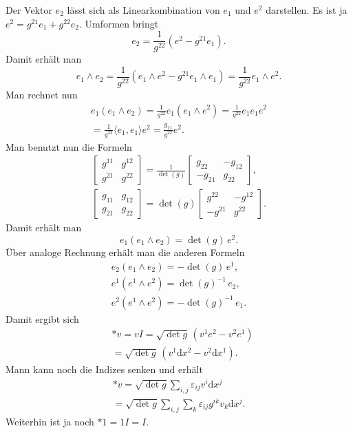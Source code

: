 \documentclass[a4paper,10pt,fleqn,twocolumn,twoside]{article}
\numberwithin{equation}{section}
\begin{document}
Der Vektor $e_2$ lässt sich als Linearkombination von $e_1$
und $e^2$ darstellen. Es ist ja $e^2=g^{21}e_1+g^{22}e_2$.
Umformen bringt
\begin{equation}
e_2 = \frac{1}{g^{22}}(e^2-g^{21}e_1).
\end{equation}
Damit erhält man
\[e_1\wedge e_2
= \frac{1}{g^{22}}(e_1\wedge e^2-g^{21}e_1\wedge e_1)
= \frac{1}{g^{22}}e_1\wedge e^2.\]
Man rechnet nun
\begin{gather*}
e_1(e_1\wedge e_2) = \frac{1}{g^{22}}e_1(e_1\wedge e^2)
= \frac{1}{g^{22}}e_1e_1e^2\\
= \frac{1}{g^{22}}\langle e_1,e_1\rangle e^2
= \frac{g_{11}}{g^{22}}e^2.
\end{gather*}
Man benutzt nun die Formeln
\begin{gather}
\begin{bmatrix}
g^{11} & g^{12}\\
g^{21} & g^{22}
\end{bmatrix}
= \frac{1}{\det(g)}
\begin{bmatrix}
g_{22} & -g_{12}\\
-g_{21} & g_{22}
\end{bmatrix},\\
\begin{bmatrix}
g_{11} & g_{12}\\
g_{21} & g_{22}
\end{bmatrix}
= \det(g)
\begin{bmatrix}
g^{22} & -g^{12}\\
-g^{21} & g^{22}
\end{bmatrix}.
\end{gather}
Damit erhält man
\begin{equation}
e_1(e_1\wedge e_2) = \det(g)\,e^2.
\end{equation}
Über analoge Rechnung erhält man die anderen Formeln
\begin{gather}
e_2(e_1\wedge e_2) = -\det(g)\,e^1,\\
e^1(e^1\wedge e^2) = \det(g)^{-1}\,e_2,\\
e^2(e^1\wedge e^2) = -\det(g)^{-1}\,e_1.
\end{gather}
Damit ergibt sich
\begin{equation}
\begin{split}
& *v = vI = \sqrt{\det g}\,(v^1 e^2 - v^2 e^1)\\
&= \sqrt{\det g}\,(v^1 \mathrm dx^2 - v^2 \mathrm dx^1).
\end{split}
\end{equation}
Mann kann noch die Indizes senken und erhält
\begin{equation}
\begin{split}
*v = \sqrt{\det g}\sum_{i,j}\varepsilon_{ij}v^i \mathrm dx^j\\
= \sqrt{\det g}\sum_{i,j}
\sum_{k}\varepsilon_{ij}g^{ik}v_k \mathrm dx^j.
\end{split}
\end{equation}
Weiterhin ist ja noch $*1 = 1I=I$.
\end{document}
